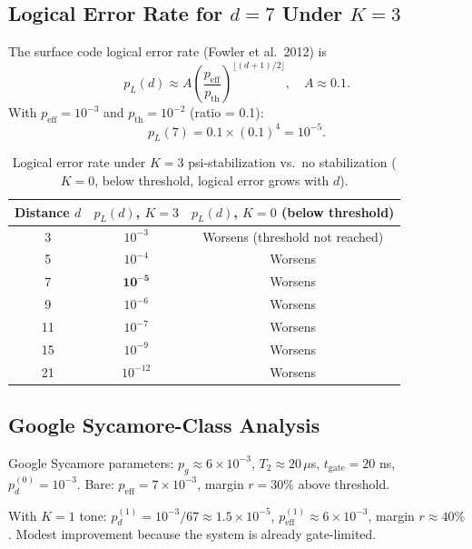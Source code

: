 \documentclass[11pt]{article}
\theoremstyle{definition}
\theoremstyle{remark}
\begin{document}
\subsection{Logical Error Rate for $d = 7$ Under $K = 3$}

The surface code logical error rate (Fowler et al.\ 2012) is
\begin{equation}
  p_L(d) \approx A\left(\frac{p_{\mathrm{eff}}}{p_{\mathrm{th}}}\right)^{\lfloor(d+1)/2\rfloor},
  \quad A \approx 0.1.
\end{equation}
With $p_{\mathrm{eff}} = 10^{-3}$ and $p_{\mathrm{th}} = 10^{-2}$ (ratio = 0.1):
\begin{equation}
  p_L(7) = 0.1\times(0.1)^4 = 10^{-5}. \label{eq:pL-d7}
\end{equation}

\begin{table}[h]
\centering
\caption{Logical error rate under $K=3$ psi-stabilization vs.\ no stabilization
($K=0$, below threshold, logical error grows with $d$).}
\label{tab:logical-error}
\begin{tabular}{@{}ccc@{}}
\toprule
Distance $d$ & $p_L(d)$, $K=3$ & $p_L(d)$, $K=0$ (below threshold) \\
\midrule
3  & $10^{-3}$ & Worsens (threshold not reached) \\
5  & $10^{-4}$ & Worsens \\
7  & $\mathbf{10^{-5}}$ & Worsens \\
9  & $10^{-6}$ & Worsens \\
11 & $10^{-7}$ & Worsens \\
15 & $10^{-9}$ & Worsens \\
21 & $10^{-12}$ & Worsens \\
\bottomrule
\end{tabular}
\end{table}

\subsection{Google Sycamore-Class Analysis}

Google Sycamore parameters: $p_g \approx 6\times10^{-3}$, $T_2 \approx 20\,\mu$s,
$t_{\mathrm{gate}} = 20$ ns, $p_d^{(0)} = 10^{-3}$.
Bare: $p_{\mathrm{eff}} = 7\times10^{-3}$, margin $r = 30\%$ above threshold.

With $K = 1$ tone: $p_d^{(1)} = 10^{-3}/67 \approx 1.5\times10^{-5}$,
$p_{\mathrm{eff}}^{(1)} \approx 6\times10^{-3}$, margin $r \approx 40\%$.
Modest improvement because the system is already gate-limited.
\end{document}
